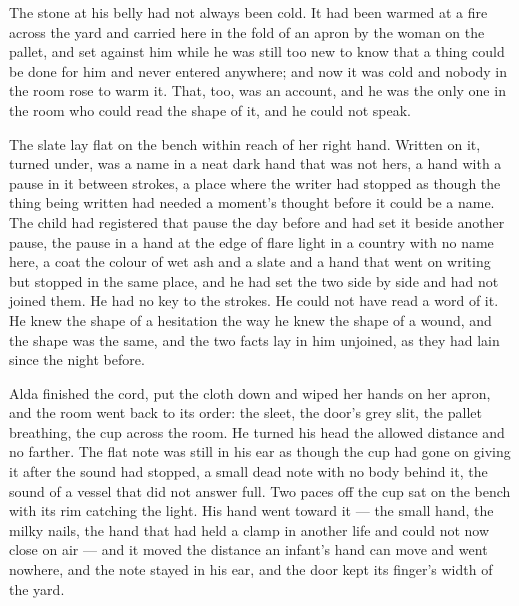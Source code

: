 The stone at his belly had not always been cold. It had been warmed at a fire across the yard and carried here in the fold of an apron by the woman on the pallet, and set against him while he was still too new to know that a thing could be done for him and never entered anywhere; and now it was cold and nobody in the room rose to warm it. That, too, was an account, and he was the only one in the room who could read the shape of it, and he could not speak.

The slate lay flat on the bench within reach of her right hand. Written on it, turned under, was a name in a neat dark hand that was not hers, a hand with a pause in it between strokes, a place where the writer had stopped as though the thing being written had needed a moment's thought before it could be a name. The child had registered that pause the day before and had set it beside another pause, the pause in a hand at the edge of flare light in a country with no name here, a coat the colour of wet ash and a slate and a hand that went on writing but stopped in the same place, and he had set the two side by side and had not joined them. He had no key to the strokes. He could not have read a word of it. He knew the shape of a hesitation the way he knew the shape of a wound, and the shape was the same, and the two facts lay in him unjoined, as they had lain since the night before.

Alda finished the cord, put the cloth down and wiped her hands on her apron, and the room went back to its order: the sleet, the door's grey slit, the pallet breathing, the cup across the room. He turned his head the allowed distance and no farther. The flat note was still in his ear as though the cup had gone on giving it after the sound had stopped, a small dead note with no body behind it, the sound of a vessel that did not answer full. Two paces off the cup sat on the bench with its rim catching the light. His hand went toward it --- the small hand, the milky nails, the hand that had held a clamp in another life and could not now close on air --- and it moved the distance an infant's hand can move and went nowhere, and the note stayed in his ear, and the door kept its finger's width of the yard.
